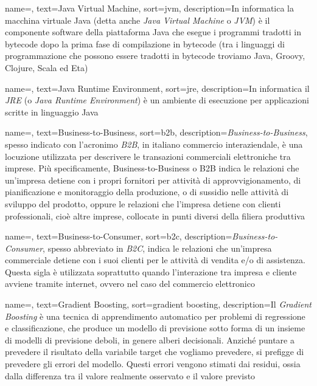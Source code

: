 {
    name=,
    text=Java Virtual Machine,
    sort=jvm,
    description={In informatica la macchina virtuale Java (detta anche \textit{Java Virtual Machine} o \textit{JVM}) è il componente software della piattaforma Java che esegue i programmi tradotti in bytecode dopo la prima fase di compilazione in bytecode (tra i linguaggi di programmazione che possono essere tradotti in bytecode troviamo Java, Groovy, Clojure, Scala ed Eta)}
}

{
    name=,
    text=Java Runtime Environment,
    sort=jre,
    description={In informatica il \textit{JRE} (o \textit{Java Runtime Environment}) è un ambiente di esecuzione per applicazioni scritte in linguaggio Java}
}

{
    name=,
    text=Business-to-Business,
    sort=b2b,
    description={\textit{Business-to-Business}, spesso indicato con l'acronimo \textit{B2B}, in italiano commercio interaziendale, è una locuzione utilizzata per descrivere le transazioni commerciali elettroniche tra imprese. Più specificamente, Business-to-Business o B2B indica le relazioni che un'impresa detiene con i propri fornitori per attività di approvvigionamento, di pianificazione e monitoraggio della produzione, o di sussidio nelle attività di sviluppo del prodotto, oppure le relazioni che l'impresa detiene con clienti professionali, cioè altre imprese, collocate in punti diversi della filiera produttiva}
}

{
    name=,
    text=Business-to-Consumer,
    sort=b2c,
    description={\textit{Business-to-Consumer}, spesso abbreviato in \textit{B2C}, indica le relazioni che un'impresa commerciale detiene con i suoi clienti per le attività di vendita e/o di assistenza. Questa sigla è utilizzata soprattutto quando l'interazione tra impresa e cliente avviene tramite internet, ovvero nel caso del commercio elettronico}
}

{
    name=,
    text=Gradient Boosting,
    sort=gradient boosting,
    description={Il \textit{Gradient Boosting} è una tecnica di apprendimento automatico per problemi di regressione e classificazione, che produce un modello di previsione sotto forma di un insieme di modelli di previsione deboli, in genere alberi decisionali. Anziché puntare a prevedere il risultato della variabile target che vogliamo prevedere, si prefigge di prevedere gli errori del modello. Questi errori vengono stimati dai residui, ossia dalla differenza tra il valore realmente osservato e il valore previsto}
}

